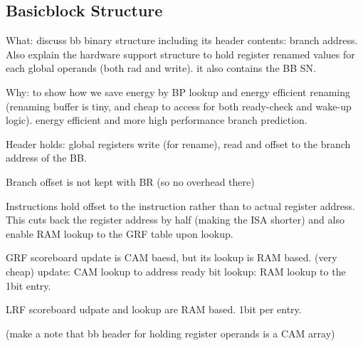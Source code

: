 \subsection{Basicblock Structure}
\label{sec:bb_struct}

What: discuss bb binary structure including its header contents: branch address.
Also explain the hardware support structure to hold register renamed values for
each global operands (both rad and write). it also contains the BB SN.

Why: to show how we save energy by BP lookup and energy efficient renaming
(renaming buffer is tiny, and cheap to access for both ready-check and wake-up
 logic). energy efficient and more high performance branch prediction.

Header holds: global registers write (for rename), read and offset to the branch
address of the BB.

Branch offset is not kept with BR (so no overhead there)

Instructions hold offset to the instruction rather than to actual register
address. This cuts back the register address by half (making the ISA shorter)
    and also enable RAM lookup to the GRF table upon lookup.

GRF scoreboard update is CAM baesd, but its lookup is RAM based. (very cheap)
    update: CAM lookup to address ready bit
    lookup: RAM lookup to the 1bit entry.

LRF scoreboard udpate and lookup are RAM based. 1bit per entry.


(make a note that bb header for holding register operands is a CAM array)

% 
% 
% 
% 
